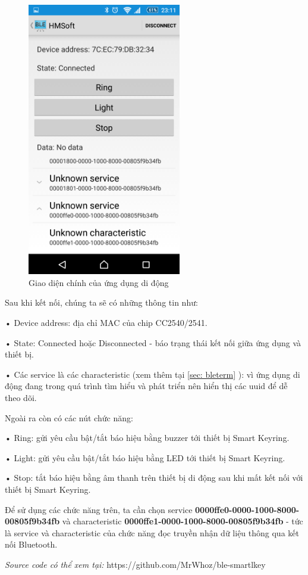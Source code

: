 	\begin{figure}[H]
		\centering    
		\includegraphics[width=0.6\textwidth]{android2}
		\caption[Giao diện chính của ứng dụng di động]{Giao diện chính của ứng dụng di động}
		\label{fig: android2}
	\end{figure}
	
	Sau khi kết nối, chúng ta sẽ có những thông tin như:
	
	• Device address: địa chỉ MAC của chip CC2540/2541.
	
	• State: Connected hoặc Disconnected -  báo trạng thái kết nối giữa ứng dụng và thiết bị.
	
	• Các service là các characteristic (xem thêm tại \ref{sec: bleterm} ): vì ứng dụng di động đang trong quá trình tìm hiểu và phát triển nên hiển thị các uuid để dễ theo dõi.
	
	Ngoài ra còn có các nút chức năng:
	
	• Ring: gửi yêu cầu bật/tắt báo hiệu bằng buzzer tới thiết bị Smart Keyring.
	
	• Light: gửi yêu cầu bật/tắt báo hiệu bằng LED tới thiết bị Smart Keyring.
	
	• Stop: tắt báo hiệu bằng âm thanh trên thiết bị di động sau khi mất kết nối với thiết bị Smart Keyring.
	
	Để sử dụng các chức năng trên, ta cần chọn service \textbf{0000ffe0-0000-1000-8000-00805f9b34fb} và characteristic \textbf{0000ffe1-0000-1000-8000-00805f9b34fb} - tức là service và characteristic của chức năng đọc truyền nhận dữ liệu thông qua kết nối Bluetooth.

\textit{Source code có thể xem tại: } https://github.com/MrWhoz/ble-smartlkey
